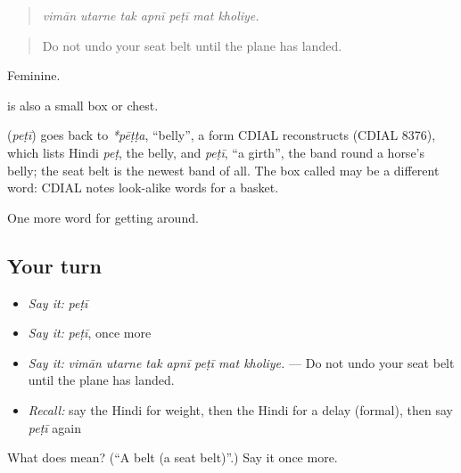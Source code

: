 \begin{quote}
      
\end{quote}

\begin{quote}
\emph{vimān utarne tak apnī peṭī mat kholiye.}
\end{quote}

\begin{quote}
Do not undo your seat belt until the plane has landed.
\end{quote}

Feminine.

 is also a small box or chest.

\begin{cousinweb}
\textbf{} (\emph{peṭī}) goes back to \emph{*pēṭṭa}, \textquotedblleft{}belly\textquotedblright{}, a form CDIAL reconstructs (CDIAL 8376), which lists Hindi \emph{peṭ}, the belly, and \emph{peṭī}, \textquotedblleft{}a girth\textquotedblright{}, the band round a horse's belly; the seat belt is the newest band of all. The box called  may be a different word: CDIAL notes look-alike words for a basket.
\end{cousinweb}

\begin{grammarlens}[title={What you've built}]
One more word for getting around.
\end{grammarlens}

\subsection*{Your turn}
\begin{itemize}
\raggedright
  \item \emph{Say it:} \emph{peṭī}
  \item \emph{Say it:} \emph{peṭī}, once more
  \item \emph{Say it:} \emph{vimān utarne tak apnī peṭī mat kholiye.} — Do not undo your seat belt until the plane has landed.
  \item \emph{Recall:} say the Hindi for weight, then the Hindi for a delay (formal), then say \emph{peṭī} again
\end{itemize}

\begin{tcolorbox}[breakable,colback=teal!4,colframe=teal!35!black,title={Before you move on}]
What does  mean? (\textquotedblleft{}A belt (a seat belt)\textquotedblright{}.) Say it once more.
\end{tcolorbox}
